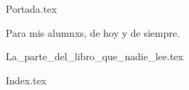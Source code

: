 {Portada.tex}
\begin{center}
  \thispagestyle{empty}
  \vspace*{\fill}
  Para mis alumnxs, de hoy y de siempre.
  \vspace*{\fill}
\end{center}
\clearpage
{La_parte_del_libro_que_nadie_lee.tex}
\tableofcontents

\mainmatter
{Index.tex}
